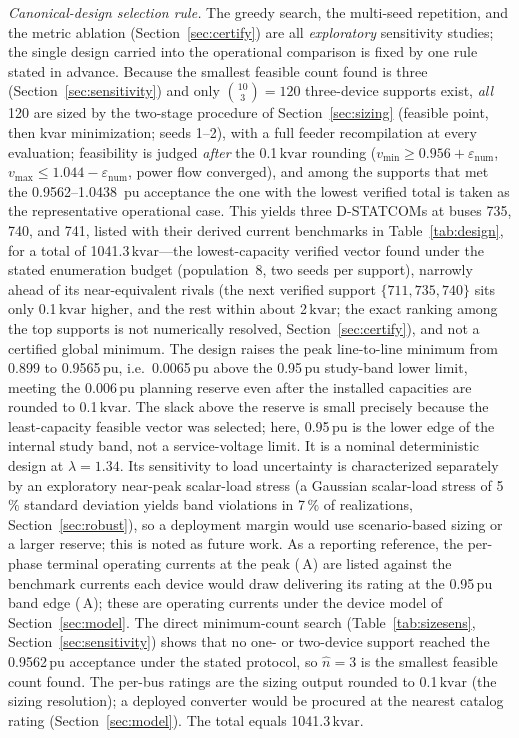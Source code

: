 \documentclass{ieeeaccess}
\makeatletter
\providecommand{\percent}{\%}
\newcommand{\num}[1]{#1}
\newcommand{\SI}[2]{#1\,\ensuremath{\mathrm{#2}}}
\newcommand{\numrange}[2]{#1\mbox{--}#2}
\def\kie@silistiii#1;#2;#3\@nil{#1, #2, and #3}
\newcommand{\SIlist}[2]{\kie@silistiii#1\@nil\,\ensuremath{\mathrm{#2}}}
\newcommand{\kvar}{\text{kvar}}
\makeatother
\begin{document}
\emph{Canonical-design selection rule.} The greedy search, the multi-seed
repetition, and the metric ablation (Section~\ref{sec:certify}) are all
\emph{exploratory} sensitivity studies; the single design carried into the
operational comparison is fixed by one rule stated in advance. Because the smallest
feasible count found is three (Section~\ref{sec:sensitivity}) and only
$\binom{10}{3}=120$ three-device supports
exist, \emph{all} 120 are sized by the two-stage procedure of
Section~\ref{sec:sizing} (feasible point, then kvar minimization; seeds 1--2), with a
full feeder recompilation at every evaluation;
feasibility is judged \emph{after} the \SI{0.1}{\kvar} rounding
($v_{\min}\ge0.956+\varepsilon_{\mathrm{num}}$,
$v_{\max}\le1.044-\varepsilon_{\mathrm{num}}$, power flow converged), and
among the supports that met the
\numrange{0.9562}{1.0438}~pu acceptance the one with the lowest verified total
is taken as the representative operational case.
This yields three D-STATCOMs at buses 735, 740, and 741, listed with their derived
current benchmarks in Table~\ref{tab:design},
for a total of \SI{1041.3}{\kvar}---the lowest-capacity verified vector
found under the stated enumeration budget (population~8, two seeds per support),
narrowly ahead of its near-equivalent rivals (the next verified support $\{711,735,740\}$
sits only \SI{0.1}{\kvar} higher, and the rest within about \SI{2}{\kvar}; the exact ranking among the top
supports is not numerically resolved, Section~\ref{sec:certify}), and not a certified
global minimum. The
design raises the peak line-to-line minimum from \num{0.899} to \SI{0.9565}{pu},
i.e.\ \SI{0.0065}{pu} above the \SI{0.95}{pu} study-band lower limit, meeting the
\SI{0.006}{pu} planning reserve even after the installed capacities are rounded to
\SI{0.1}{\kvar}. The slack above the reserve is small precisely because the
least-capacity feasible vector was selected; here, \SI{0.95}{pu} is the lower
edge of the internal study band, not a service-voltage limit. It is a nominal
deterministic design at $\lambda=1.34$. Its sensitivity to load
uncertainty is characterized separately by an exploratory near-peak scalar-load stress (a Gaussian scalar-load stress of \SI{5}{\percent} standard deviation yields
band violations in \SI{7}{\percent} of realizations, Section~\ref{sec:robust}), so a
deployment margin would use scenario-based sizing or a larger reserve; this is noted
as future work. As a
reporting reference, the per-phase terminal operating currents at the peak
(\SIlist{48.2;30.6;48.8}{A}) are listed against the benchmark currents each device
would draw delivering its rating at the \SI{0.95}{pu} band edge
(\SIlist{49.8;31.6;50.5}{A}); these are operating currents under the device model of
Section~\ref{sec:model}. The direct minimum-count search
(Table~\ref{tab:sizesens}, Section~\ref{sec:sensitivity}) shows that no one- or
two-device support reached the \SI{0.9562}{pu} acceptance under the stated protocol,
so $\hat n=3$ is the smallest feasible count found.
The per-bus ratings are the sizing output rounded to \SI{0.1}{\kvar} (the sizing
resolution); a deployed converter would be procured at the nearest catalog rating
(Section~\ref{sec:model}). The total equals \SI{1041.3}{\kvar}.
\end{document}
